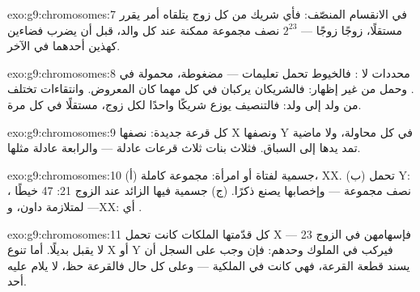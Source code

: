 \begin{solution}{exo:g9:chromosomes:7}
في الانقسام المنصّف: فأي شريك من كل زوج يتلقاه 
أمر يقرر مستقلًا، زوجًا زوجًا --- $2^{23}$ نصف مجموعة
ممكنة عند كل والد، قبل أن يضرب  فضاءين كهذين
أحدهما في الآخر.
\end{solution}

\begin{solution}{exo:g9:chromosomes:8}
محددات لا : فالخيوط تحمل تعليمات --- مضغوطة، محمولة
في . وحمل من غير إظهار: فالشريكان يركبان في كل
 مهما كان المعروض. وانتقاءات تختلف من ولد إلى ولد:
فالتنصيف يوزع شريكًا واحدًا لكل زوج، مستقلًا في كل مرة.
\end{solution}

\begin{solution}{exo:g9:chromosomes:9}
كل  قرعة جديدة:   نصفها X ونصفها Y في كل
محاولة، ولا  ماضية تمد يدها إلى السباق. فثلاث بنات
ثلاث قرعات عادلة --- والرابعة عادلة مثلها.
\end{solution}

\begin{solution}{exo:g9:chromosomes:10}
(أ)  جسمية لفتاة أو امرأة: مجموعة كاملة، XX. (ب)
 تحمل Y: ، نصف مجموعة --- وإخصابها يصنع ذكرًا.
(ج)  جسمية فيها الزائد عند الزوج 21: 47 خيطًا ---
 لمتلازمة داون، وXX: أي .
\end{solution}

\begin{solution}{exo:g9:chromosomes:11}
كل  قدّمتها الملكات كانت تحمل X --- فإسهامهن في
الزوج 23 لا يقبل بديلًا. أما تنوع X أو Y فيركب في 
الملوك وحدهم: فإن وجب على السجل أن يسند قطعة القرعة، فهي
كانت في  الملكية --- وعلى كل حال فالقرعة حظ، لا
يلام عليه أحد.
\end{solution}

